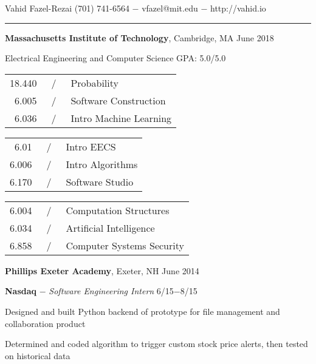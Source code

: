 \documentclass[11pt]{article}
\newcommand{\msection}[1]{\vspace{1em}\marginnote{#1}} %
\newcommand{\bt}[1]{\textbf{#1}} %
\newcommand{\gap}[0]{\vspace{0.5em}} %
\newcommand{\dash}[0]{ $-$ } %
\newcommand{\tabsep}[0]{\, / \,} %
\begin{document}

{\Huge Vahid Fazel-Rezai} \hfill  (701) 741-6564\dash vfazel@mit.edu\dash http://vahid.io

\vspace{0.2em}

\hspace{-1.2in}\rule{7.9in}{0.2em}

\vspace{-0.4em}



\msection{Education}

\bt{Massachusetts Institute of Technology}, Cambridge, MA \hfill June 2018

Electrical Engineering and Computer Science \hfill GPA: 5.0/5.0 

\vspace{0.15em}\begin{tabular}{rcl}
18.440 & \tabsep & Probability \\
6.005 & \tabsep & Software Construction \\
6.036 & \tabsep & Intro Machine Learning
\end{tabular}
\hfill
\begin{tabular}{rcl}
6.01 & \tabsep & Intro EECS \\
6.006 & \tabsep & Intro Algorithms \\
6.170 & \tabsep & Software Studio
\end{tabular}
\hfill
\begin{tabular}{rcl}
6.004 & \tabsep & Computation Structures \\
6.034 & \tabsep & Artificial Intelligence \\
6.858 & \tabsep & Computer Systems Security
\end{tabular}

\gap

\bt{Phillips Exeter Academy}, Exeter, NH \hfill June 2014



\msection{Work}

\bt{Nasdaq}\dash \emph{Software Engineering Intern} \hfill 6/15$-$8/15

Designed and built Python backend of prototype for file management and collaboration product

Determined and coded algorithm to trigger custom stock price alerts, then tested on historical data

\end{document}
